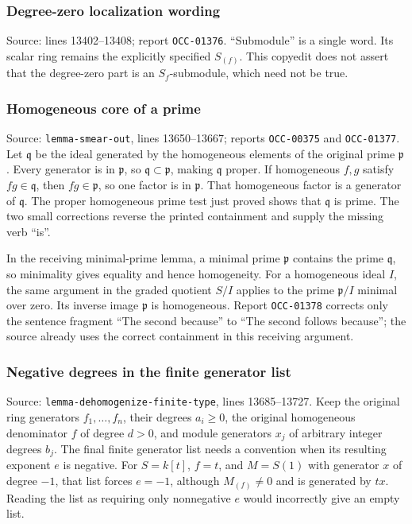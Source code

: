 \subsubsection{Degree-zero localization wording}\label{degree-zero-localization-wording}

Source: lines 13402--13408; report \texttt{OCC-01376}. ``Submodule'' is a single word. Its scalar ring remains the explicitly specified \(S_{(f)}\). This copyedit does not assert that the degree-zero part is an \(S_f\)-submodule, which need not be true.

\subsubsection{Homogeneous core of a prime}\label{homogeneous-core-of-a-prime}

Source: \texttt{lemma-smear-out}, lines 13650--13667; reports \texttt{OCC-00375} and \texttt{OCC-01377}. Let \(\mathfrak q\) be the ideal generated by the homogeneous elements of the original prime \(\mathfrak p\). Every generator is in \(\mathfrak p\), so \(\mathfrak q\subset\mathfrak p\), making \(\mathfrak q\) proper. If homogeneous \(f,g\) satisfy \(fg\in\mathfrak q\), then \(fg\in\mathfrak p\), so one factor is in \(\mathfrak p\). That homogeneous factor is a generator of \(\mathfrak q\). The proper homogeneous prime test just proved shows that \(\mathfrak q\) is prime. The two small corrections reverse the printed containment and supply the missing verb ``is''.

In the receiving minimal-prime lemma, a minimal prime \(\mathfrak p\) contains the prime \(\mathfrak q\), so minimality gives equality and hence homogeneity. For a homogeneous ideal \(I\), the same argument in the graded quotient \(S/I\) applies to the prime \(\mathfrak p/I\) minimal over zero. Its inverse image \(\mathfrak p\) is homogeneous. Report \texttt{OCC-01378} corrects only the sentence fragment ``The second because'' to ``The second follows because''; the source already uses the correct containment in this receiving argument.

\subsubsection{Negative degrees in the finite generator list}\label{negative-degrees-in-the-finite-generator-list}

Source: \texttt{lemma-dehomogenize-finite-type}, lines 13685--13727. Keep the original ring generators \(f_1,\ldots,f_n\), their degrees \(a_i\geq0\), the original homogeneous denominator \(f\) of degree \(d>0\), and module generators \(x_j\) of arbitrary integer degrees \(b_j\). The final finite generator list needs a convention when its resulting exponent \(e\) is negative. For \(S=k[t]\), \(f=t\), and \(M=S(1)\) with generator \(x\) of degree \(-1\), that list forces \(e=-1\), although \(M_{(f)}\ne0\) and is generated by \(tx\). Reading the list as requiring only nonnegative \(e\) would incorrectly give an empty list.

